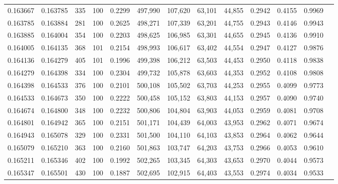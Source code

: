 \begin{tabular}{rrrrrrrrrrrrr}
0.163667 & 0.163785 &   335 & 100 &                                     0.2299 & 497,990 & 107,620 &  63,101 &  44,855 & 0.2942 & 0.4155 & 0.9969 \\
0.163785 & 0.163884 &   281 & 100 &                                     0.2625 & 498,271 & 107,339 &  63,201 &  44,755 & 0.2943 & 0.4146 & 0.9943 \\
0.163885 & 0.164004 &   354 & 100 &                                     0.2203 & 498,625 & 106,985 &  63,301 &  44,655 & 0.2945 & 0.4136 & 0.9910 \\
0.164005 & 0.164135 &   368 & 101 &                                     0.2154 & 498,993 & 106,617 &  63,402 &  44,554 & 0.2947 & 0.4127 & 0.9876 \\
0.164136 & 0.164279 &   405 & 101 &                                     0.1996 & 499,398 & 106,212 &  63,503 &  44,453 & 0.2950 & 0.4118 & 0.9838 \\
0.164279 & 0.164398 &   334 & 100 &                                     0.2304 & 499,732 & 105,878 &  63,603 &  44,353 & 0.2952 & 0.4108 & 0.9808 \\
0.164398 & 0.164533 &   376 & 100 &                                     0.2101 & 500,108 & 105,502 &  63,703 &  44,253 & 0.2955 & 0.4099 & 0.9773 \\
0.164533 & 0.164673 &   350 & 100 &                                     0.2222 & 500,458 & 105,152 &  63,803 &  44,153 & 0.2957 & 0.4090 & 0.9740 \\
0.164674 & 0.164800 &   348 & 100 &                                     0.2232 & 500,806 & 104,804 &  63,903 &  44,053 & 0.2959 & 0.4081 & 0.9708 \\
0.164801 & 0.164942 &   365 & 100 &                                     0.2151 & 501,171 & 104,439 &  64,003 &  43,953 & 0.2962 & 0.4071 & 0.9674 \\
0.164943 & 0.165078 &   329 & 100 &                                     0.2331 & 501,500 & 104,110 &  64,103 &  43,853 & 0.2964 & 0.4062 & 0.9644 \\
0.165079 & 0.165210 &   363 & 100 &                                     0.2160 & 501,863 & 103,747 &  64,203 &  43,753 & 0.2966 & 0.4053 & 0.9610 \\
0.165211 & 0.165346 &   402 & 100 &                                     0.1992 & 502,265 & 103,345 &  64,303 &  43,653 & 0.2970 & 0.4044 & 0.9573 \\
0.165347 & 0.165501 &   430 & 100 &                                     0.1887 & 502,695 & 102,915 &  64,403 &  43,553 & 0.2974 & 0.4034 & 0.9533 \\

\end{tabular}
